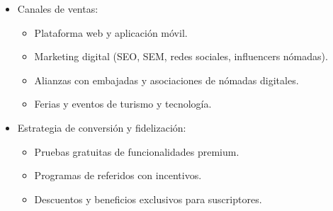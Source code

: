 \begin{itemize}
   \item Canales de ventas:
    \begin{itemize}
        \item Plataforma web y aplicación móvil.
        \item Marketing digital (SEO, SEM, redes sociales, influencers nómadas).
        \item Alianzas con embajadas y asociaciones de nómadas digitales.
        \item Ferias y eventos de turismo y tecnología.
    \end{itemize}
   \item Estrategia de conversión y fidelización:
    \begin{itemize}
        \item Pruebas gratuitas de funcionalidades premium.
        \item Programas de referidos con incentivos.
        \item Descuentos y beneficios exclusivos para suscriptores.
    \end{itemize}
\end{itemize} 
